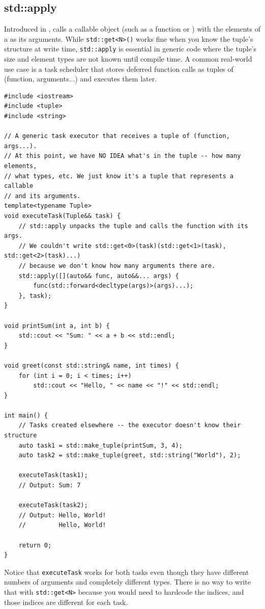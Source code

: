 \subsection{std::apply}
Introduced in ,  calls a callable object (such as a function or ) with the elements of a  as its arguments. While \texttt{std::get<N>()} works fine when you know the tuple's structure at write time, \texttt{std::apply} is essential in generic code where the tuple's size and element types are not known until compile time. A common real-world use case is a task scheduler that stores deferred function calls as tuples of (function, arguments...) and executes them later.
\begin{lstlisting}
#include <iostream>
#include <tuple>
#include <string>

// A generic task executor that receives a tuple of (function, args...).
// At this point, we have NO IDEA what's in the tuple -- how many elements,
// what types, etc. We just know it's a tuple that represents a callable
// and its arguments.
template<typename Tuple>
void executeTask(Tuple&& task) {
    // std::apply unpacks the tuple and calls the function with its args.
    // We couldn't write std::get<0>(task)(std::get<1>(task), std::get<2>(task)...)
    // because we don't know how many arguments there are.
    std::apply([](auto&& func, auto&&... args) {
        func(std::forward<decltype(args)>(args)...);
    }, task);
}

void printSum(int a, int b) {
    std::cout << "Sum: " << a + b << std::endl;
}

void greet(const std::string& name, int times) {
    for (int i = 0; i < times; i++)
        std::cout << "Hello, " << name << "!" << std::endl;
}

int main() {
    // Tasks created elsewhere -- the executor doesn't know their structure
    auto task1 = std::make_tuple(printSum, 3, 4);
    auto task2 = std::make_tuple(greet, std::string("World"), 2);

    executeTask(task1);
    // Output: Sum: 7

    executeTask(task2);
    // Output: Hello, World!
    //         Hello, World!

    return 0;
}
\end{lstlisting}
Notice that \texttt{executeTask} works for both tasks even though they have different numbers of arguments and completely different types. There is no way to write that with \texttt{std::get<N>} because you would need to hardcode the indices, and those indices are different for each task.

